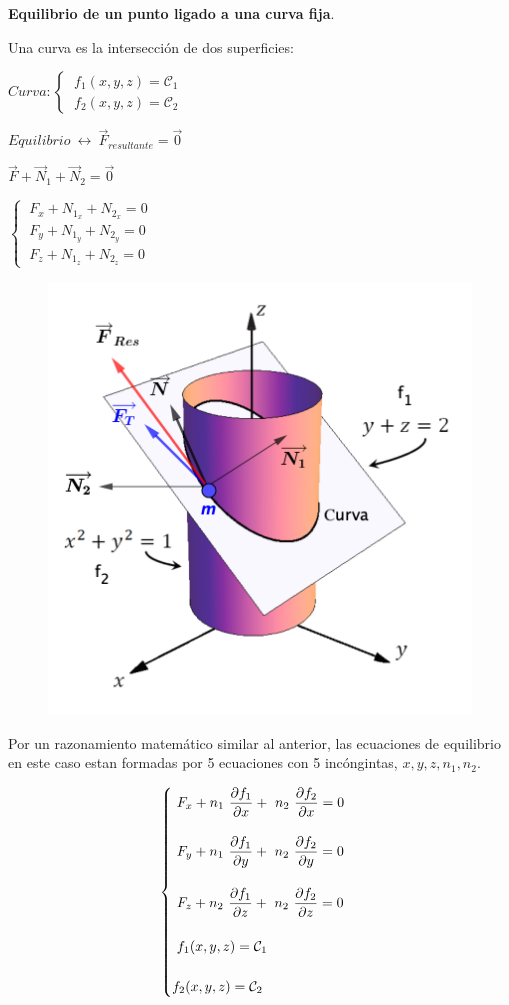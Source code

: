 \begin{ejem}
\textbf{Equilibrio de un punto ligado a una curva fija}.	
\end{ejem}
\begin{multicols}{2}
	
Una curva es la intersección de dos superficies:

$Curva: \begin{cases} \ f_1(x,y,z)=\mathcal C_1 \\ \ f_2(x,y,z)=\mathcal C_2 \end{cases}$

$Equilibrio \ \leftrightarrow \ \overrightarrow{F}_{resultante}=\vec 0$

$\overrightarrow{F}+\overrightarrow{N}_1 + \overrightarrow{N}_2=\vec 0$

$\begin{cases}\ F_x+N_{1_x}+N_{2_x}=0  \\  \ F_y+N_{1_y}+N_{2_y}=0 \\ \ F_z+N_{1_z}+N_{2_z}=0 \end{cases}$
 
\begin{figure}[H]
	\centering
	\includegraphics[width=.55\textwidth]{imagenes/imagenes05/T05IM05.png}
\end{figure}
\end{multicols}

Por un razonamiento matemático similar al anterior, las ecuaciones de equilibrio en este caso estan formadas por 5 ecuaciones con 5 incóngintas, $x,y,z,n_1,n_2$.

$$\displaystyle
\begin{cases}
\displaystyle \ F_x+n_1 \ \pdv{f_1}{x} + \ n_2\ \pdv{f_2}{x}=0 \\ \\ \displaystyle \ F_y+n_1\ \pdv{f_1}{y} + \ n_2\ \pdv{f_2}{y}=0  \\  \\ \displaystyle \ F_z+n_2\ \pdv{f_1}{z} + \ n_2\ \pdv{f_2}{z}=0  \\ \\ \ f_1(x,y,z)=\mathcal C_1 \\ \\f_2(x,y,z)=\mathcal C_2
\end{cases}$$


